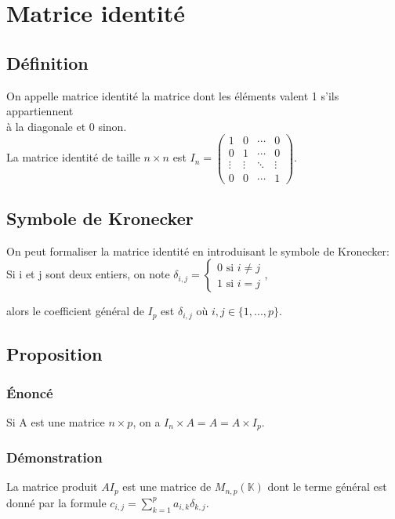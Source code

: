 \documentclass[a4paper,10pt]{book} %
\newcommand{\K}{\mathbb{K}}
\begin{document}
\newpage

\section{Matrice identité}
\subsection{Définition}
On appelle matrice identité la matrice dont les éléments valent 1 s'ils appartiennent\\
à la diagonale et 0 sinon.\\

La matrice identité de taille $n\times n$ est $I_{n}=\begin{pmatrix}
1 & 0 & \cdots & 0 \\
0 & 1 & \cdots & 0\\
\vdots & \vdots & \ddots & \vdots \\
0 & 0 & \cdots & 1
\end{pmatrix}$.

\subsection{Symbole de Kronecker}
On peut formaliser la matrice identité en introduisant le symbole de Kronecker:\\

Si i et j sont deux entiers, on note $\delta_{i,j}=\left\{ \begin{array}{rcl}
0\text{ si }i\neq j \\
1\text{ si }i=j \end{array}\right.$,

alors le coefficient général de $I_{p}$ est $\delta_{i,j}$ où $i,j\in \{1,...,p\}$.

\subsection{Proposition}
\subsubsection{Énoncé}
Si A est une matrice $n\times p$, on a $I_{n}\times A=A=A\times I_{p}$.

\subsubsection{Démonstration}
La matrice produit $AI_{p}$ est une matrice de $M_{n,p}(\K)$ dont le terme général est donné par la formule $c_{i,j}=\sum\limits_{k=1}^{p} a_{i,k}\delta_{k,j}$.\\
\end{document}
